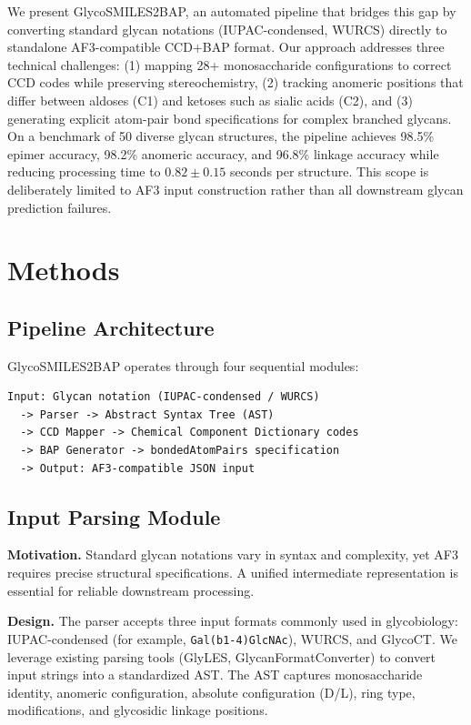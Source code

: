 \documentclass[11pt,a4paper]{article}
\begin{document}
We present GlycoSMILES2BAP, an automated pipeline that bridges this gap by converting standard glycan notations (IUPAC-condensed, WURCS) directly to standalone AF3-compatible CCD+BAP format. Our approach addresses three technical challenges: (1) mapping 28+ monosaccharide configurations to correct CCD codes while preserving stereochemistry, (2) tracking anomeric positions that differ between aldoses (C1) and ketoses such as sialic acids (C2), and (3) generating explicit atom-pair bond specifications for complex branched glycans. On a benchmark of 50 diverse glycan structures, the pipeline achieves 98.5\% epimer accuracy, 98.2\% anomeric accuracy, and 96.8\% linkage accuracy while reducing processing time to $0.82 \pm 0.15$ seconds per structure. This scope is deliberately limited to AF3 input construction rather than all downstream glycan prediction failures.

\section{Methods}

\subsection{Pipeline Architecture}

GlycoSMILES2BAP operates through four sequential modules:

\begin{verbatim}
Input: Glycan notation (IUPAC-condensed / WURCS)
  -> Parser -> Abstract Syntax Tree (AST)
  -> CCD Mapper -> Chemical Component Dictionary codes
  -> BAP Generator -> bondedAtomPairs specification
  -> Output: AF3-compatible JSON input
\end{verbatim}

\subsection{Input Parsing Module}

\textbf{Motivation.} Standard glycan notations vary in syntax and complexity, yet AF3 requires precise structural specifications. A unified intermediate representation is essential for reliable downstream processing.

\textbf{Design.} The parser accepts three input formats commonly used in glycobiology: IUPAC-condensed (for example, \texttt{Gal(b1-4)GlcNAc}), WURCS, and GlycoCT. We leverage existing parsing tools (GlyLES, GlycanFormatConverter) to convert input strings into a standardized AST. The AST captures monosaccharide identity, anomeric configuration, absolute configuration (D/L), ring type, modifications, and glycosidic linkage positions.
\end{document}
